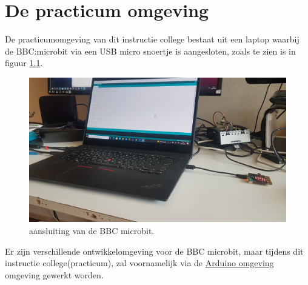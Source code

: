 \chapter{De practicum omgeving}
\label{chap:omgeving}
De practicumomgeving van dit instructie college bestaat uit een laptop waarbij de BBC:microbit via een USB micro snoertje is aangesloten, zoals te zien is in figuur \ref{fig:aansluiting}.
	\begin{figure}[h!]
	\captionsetup{justification=centering}
	\includegraphics[width=0.40 \linewidth]{figuren/aansluitingBBC}
	\centering
	\caption{aansluiting van de BBC microbit.}
	\label{fig:aansluiting}
\end{figure}
Er zijn verschillende ontwikkelomgeving voor de BBC microbit, maar tijdens dit instructie college(practicum), zal voornamelijk via de \href{https://https://www.arduino.cc/en/software}{Arduino omgeving} omgeving gewerkt worden.



